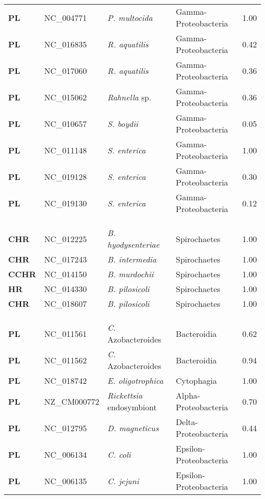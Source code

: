 \begin{adjustwidth}{-3cm}{2cm}
{\begin{supertabular}{>{\bfseries}l|p{0.1\textwidth}p{0.14\textwidth}l|l}
PL & NC\_004771 & \textit{P. multocida} & Gamma-Proteobacteria & 1.00\\
PL & NC\_016835 & \textit{R. aquatilis} & Gamma-Proteobacteria & 0.42\\
PL & NC\_017060 & \textit{R. aquatilis} & Gamma-Proteobacteria & 0.36\\
PL & NC\_015062 & \textit{Rahnella} sp. & Gamma-Proteobacteria & 0.36\\
PL & NC\_010657 & \textit{S. boydii} & Gamma-Proteobacteria & 0.05\\
PL & NC\_011148 & \textit{S. enterica} & Gamma-Proteobacteria & 1.00\\
PL & NC\_019128 & \textit{S. enterica} & Gamma-Proteobacteria & 0.30\\
PL & NC\_019130 & \textit{S. enterica} & Gamma-Proteobacteria & 0.12\\
\\
\\
\hline\\
CHR & NC\_012225 & \textit{B. hyodysenteriae} & Spirochaetes & 1.00\\
CHR & NC\_017243 & \textit{B. intermedia} & Spirochaetes & 1.00\\
CCHR & NC\_014150 & \textit{B. murdochii} & Spirochaetes & 1.00\\
HR & NC\_014330 & \textit{B. pilosicoli}& Spirochaetes & 1.00\\
CHR & NC\_018607 & \textit{B. pilosicoli} & Spirochaetes & 1.00\\
\\
\\
\hline\\
PL & NC\_011561 & \textit{C}. Azobacteroides & Bacteroidia & 0.62\\
PL & NC\_011562 & \textit{C}. Azobacteroides & Bacteroidia & 0.94\\
PL & NC\_018742 & \textit{E. oligotrophica} & Cytophagia & 1.00\\
PL & NZ\_CM000772 & \textit{Rickettsia} endosymbiont & Alpha-Proteobacteria & 0.70\\
PL & NC\_012795 & \textit{D. magneticus} & Delta-Proteobacteria & 0.44\\
PL & NC\_006134 & \textit{C. coli} & Epsilon-Proteobacteria & 1.00\\
PL & NC\_006135 & \textit{C. jejuni} & Epsilon-Proteobacteria & 1.00\\

\end{supertabular}}
\end{adjustwidth}
